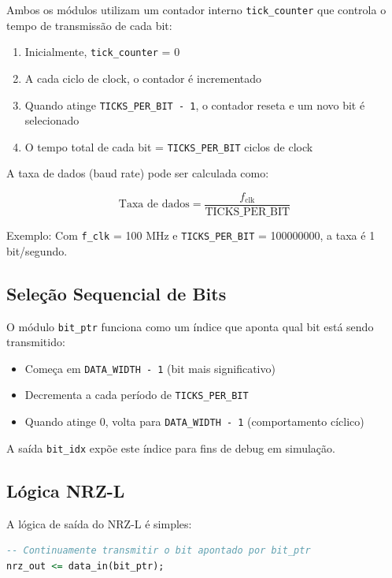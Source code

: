 \documentclass[11pt,a4paper]{article}
\begin{document}
Ambos os módulos utilizam um contador interno \texttt{tick\_counter} que controla o tempo de transmissão de cada bit:

\begin{enumerate}
    \item Inicialmente, \texttt{tick\_counter} = 0
    \item A cada ciclo de clock, o contador é incrementado
    \item Quando atinge \texttt{TICKS\_PER\_BIT - 1}, o contador reseta e um novo bit é selecionado
    \item O tempo total de cada bit = \texttt{TICKS\_PER\_BIT} ciclos de clock
\end{enumerate}

A taxa de dados (baud rate) pode ser calculada como:

\begin{equation}
\text{Taxa de dados} = \frac{f_{\text{clk}}}{\text{TICKS\_PER\_BIT}}
\end{equation}

Exemplo: Com \texttt{f\_clk} = 100 MHz e \texttt{TICKS\_PER\_BIT} = 100000000, a taxa é 1 bit/segundo.

\subsection{Seleção Sequencial de Bits}

O módulo \texttt{bit\_ptr} funciona como um índice que aponta qual bit está sendo transmitido:

\begin{itemize}
    \item Começa em \texttt{DATA\_WIDTH - 1} (bit mais significativo)
    \item Decrementa a cada período de \texttt{TICKS\_PER\_BIT}
    \item Quando atinge 0, volta para \texttt{DATA\_WIDTH - 1} (comportamento cíclico)
\end{itemize}

A saída \texttt{bit\_idx} expõe este índice para fins de debug em simulação.

\subsection{Lógica NRZ-L}

A lógica de saída do NRZ-L é simples:

\begin{lstlisting}[language=VHDL]
-- Continuamente transmitir o bit apontado por bit_ptr
nrz_out <= data_in(bit_ptr);
\end{lstlisting}
\end{document}
